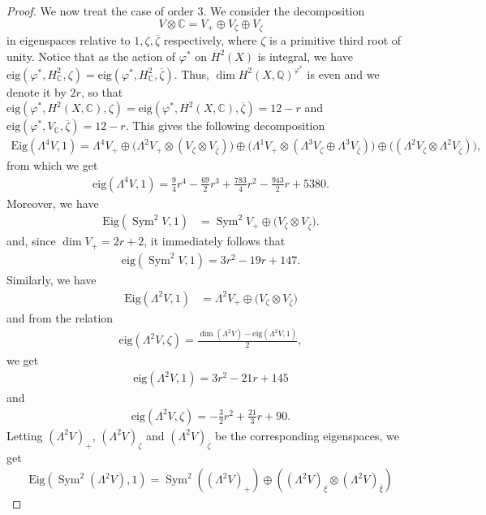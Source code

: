 \documentclass[a4paper,11pt]{amsart}
\newcommand{\Q}{{\mathbb Q}}
\newcommand{\Vz}{V_\zeta}
\newcommand{\Vb}{{V_{\overline{\zeta}}}}
\newcommand{\eig}{{\mathrm{eig}}}
\newcommand{\Eig}{{\mathrm{Eig}}}
\DeclareMathOperator{\Sym}{Sym}
\theoremstyle{plain}
\theoremstyle{remark}
\begin{document}
\begin{proof}
We now treat the case of order 3. We consider the decomposition \[V  \otimes \mathbb C = V_+ \oplus \Vz \oplus \Vb\] in eigenspaces relative to \(1,\zeta,\overline{\zeta}\) respectively, where \(\zeta\) is a primitive third root of unity. Notice that as the action of $\varphi^*$ on $H^2(X)$ is integral, we have $\eig(\varphi^*,H^2_\mathbb C,\zeta) = \eig(\varphi^*,H^2_\mathbb C, \overline{\zeta})$. Thus, $\dim H^2(X,\Q)^{\varphi^*}$ is even and we denote it by $2r$, so that $\eig(\varphi^*, H^2(X,\mathbb C),\zeta) = \eig(\varphi^*,  H^2(X,\mathbb C),\overline\zeta) = 12-r$ and $\eig(\varphi^*, V_\mathbb C, \overline\zeta) = 12-r$. 
This gives the following decomposition
{\small\begin{align*}
    \Eig(\Lambda^4 V,1)=     \Lambda^4 V_+ \oplus \big(\Lambda^2 V_+ \otimes (\Vz \otimes \Vb)\big) \oplus \big(\Lambda^1V_+ \otimes (\Lambda^3\Vz \oplus \Lambda^3\Vb)\big) \oplus \big((\Lambda^2\Vz \otimes \Lambda^2\Vb)\big),
\end{align*}}
 from which we get 
\begin{align*}
    \eig(\Lambda^4 V,1)=
    \frac{9}{4}r^4-\frac{69}{2}r^3+\frac{783}{4}r^2-\frac{943}{2}r+5380.
\end{align*}
 Moreover, we have 
\begin{align*}
    \Eig(\Sym^2 V,1) &= \Sym^2 V_+\oplus \big(\Vz \otimes \Vb\big).
\end{align*}
and, since \(\dim V_+=2r+2\), it immediately follows that
\begin{align*}
    \eig(\Sym^2V,1)=
    3r^2-19r+147.
\end{align*}
Similarly, we have 
\begin{align*}
   \Eig(\Lambda^2 V,1) &=  \Lambda^2 V_+ \oplus \big(\Vz \otimes \Vb\big)
\end{align*}
and from the relation 
\begin{align*}\label{formula_3}
    \eig(\Lambda^2 V,\zeta)=
    \frac{\dim(\Lambda^2V)-\eig(\Lambda^2 V,1)}{2},
\end{align*}
we get 
\begin{align*}
    \eig(\Lambda^2 V,1)=3r^2-21r+145
\end{align*}
and 
\begin{align*}
    \eig(\Lambda^2 V,\zeta)=-\frac{3}{2}r^2+\frac{21}{3}r+90.
\end{align*}
Letting \((\Lambda^2 V)_+\), \((\Lambda^2 V)_\zeta\) and \((\Lambda^2 V)_{\overline{\zeta}}\) be the corresponding eigenspaces, we get 
\begin{align*}
\Eig(\Sym^2(\Lambda^2V),1)= \Sym^2((\Lambda^2 V)_+)\oplus((\Lambda^2 V)_\xi \otimes (\Lambda^2 V)_{\overline{\xi}})

\end{align*}
\end{proof}
\end{document}
